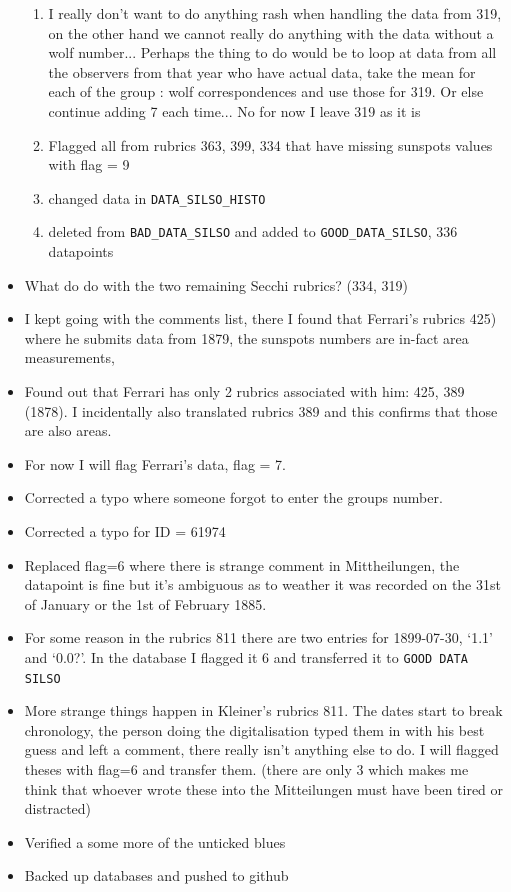 \documentclass[12pt]{article}
\begin{document}
\begin{itemize}
\begin{enumerate}
        \item I really don't want to do anything rash when handling the data from 319, on the other hand we cannot really do anything with the data without a wolf number... Perhaps the thing to do would be to loop at data from all the observers from that year who have actual data, take the mean for each of the group : wolf correspondences and use those for 319. Or else continue adding 7 each time... No for now I leave 319 as it is
        \item Flagged all from rubrics 363, 399, 334 that have missing sunspots values with flag = 9
        \item changed data in \texttt{DATA\_SILSO\_HISTO}
        \item deleted from \texttt{BAD\_DATA\_SILSO} and added to \texttt{GOOD\_DATA\_SILSO}, 336 datapoints
    \end{enumerate}
    \item What do do with the two remaining Secchi rubrics? (334, 319)
    \item I kept going with the comments list, there I found that Ferrari's rubrics 425) where he submits data from 1879, the sunspots numbers are in-fact area measurements, 
    \item Found out that Ferrari has only 2 rubrics associated with him: 425, 389 (1878). I incidentally also translated rubrics 389 and this confirms that those are also areas. 
    \item For now I will flag Ferrari's data, flag = 7. 
    \item Corrected a typo where someone forgot to enter the groups number.
    \item Corrected a typo for ID = 61974
    \item Replaced flag=6 where there is strange comment in Mittheilungen, the datapoint is fine but it's ambiguous as to weather it was recorded on the 31st of January or the 1st of February 1885.
    \item For some reason in the rubrics 811 there are two entries for 1899-07-30, `1.1' and `0.0?'. In the database I flagged it 6 and transferred it to \texttt{GOOD DATA SILSO}
    \item More strange things happen in Kleiner's rubrics 811. The dates start to break chronology, the person doing the digitalisation typed them in with his best guess and left a comment, there really isn't anything else to do. I will flagged theses with flag=6 and transfer them. (there are only 3 which makes me think that whoever wrote these into the Mitteilungen must have been tired or distracted)
    \item Verified a some more of the unticked blues
    \item Backed up databases and pushed to github
\end{itemize}
\end{document}
